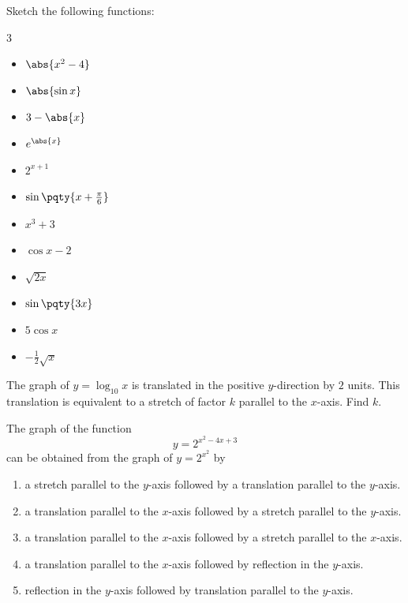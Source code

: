 \documentclass{article}
\begin{document}
\begin{example}
    Sketch the following functions:
    \begin{multicols}{3}
        \begin{itemize}
            \item \(\abs{x^2 - 4}\)
            \item \(\abs{\sin x}\)
            \item \(3 - \abs{x}\)
            \item \(e^{\abs{x}}\)
            \item \(2^{x + 1}\)
            \item \(\sin\pqty{x + \frac{\pi}{6}}\)
            \item \(x^3 + 3\)
            \item \(\cos x - 2\)
            \item \(\sqrt{2x}\)
            \item \(\sin \pqty{3x}\)
            \item \(5 \cos x\)
            \item \(- \frac{1}{2} \sqrt{x}\)
        \end{itemize}
    \end{multicols}
\end{example}

\begin{example}[TMUA 2017 P1 Q18]
    The graph of \(y = \log_{10} x\) is translated in the positive \(y\)-direction by \(2\) units. This translation is equivalent to a stretch of factor \(k\) parallel to the \(x\)-axis. Find \(k\).
\end{example}

\begin{example}
    The graph of the function
    \[
        y = 2^{x^2 - 4x + 3}
    \]
    can be obtained from the graph of \(y = 2^{x^2}\) by
    \begin{enumerate}[label=(\alph*)]
        \item a stretch parallel to the \(y\)-axis followed by a translation parallel to the \(y\)-axis.
        \item a translation parallel to the \(x\)-axis followed by a stretch parallel to the \(y\)-axis.
        \item a translation parallel to the \(x\)-axis followed by a stretch parallel to the \(x\)-axis.
        \item a translation parallel to the \(x\)-axis followed by reflection in the \(y\)-axis.
        \item reflection in the \(y\)-axis followed by translation parallel to the \(y\)-axis.
    \end{enumerate}
\end{example}
\end{document}
